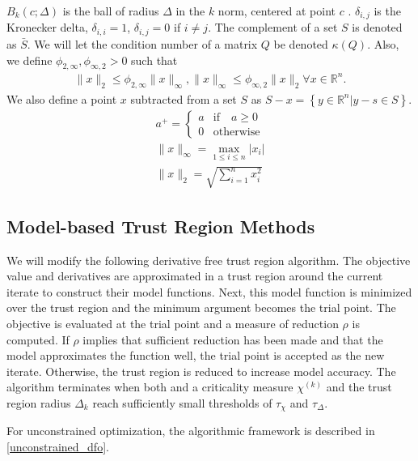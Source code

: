 \documentclass{article}
\theoremstyle{case}
\numberwithin{theorem}{subsection}
\newcommand{\chik}{{\chi^{(k)}}}
\newcommand{\Rn}{\mathbb R^n}
\begin{document}
$B_k(c; \Delta)$ is the ball of radius $\Delta$ in the $k$ norm, centered at point $c$ .
$\delta_{i,j}$ is the Kronecker delta, $\delta_{i,i} = 1$, $\delta_{i,j} = 0$ if $i\ne j$.
The complement of a set $S$ is denoted as $\bar S$.
We will let the condition number of a matrix $Q$ be denoted $\kappa(Q)$.
Also, we define $\phi_{2,\infty},\phi_{\infty,2}>0$ such that 
\begin{align}
\|x\|_2 \le \phi_{2, \infty}\|x\|_{\infty}, \|x\|_{\infty} \le \phi_{\infty,2}\|x\|_2\forall x \in \Rn \label{define_norm_changers}.
\end{align}
We also define a point $x$ subtracted from a set $S$ as $S - x = \left\{y \in \Rn | y - s \in S\right\}$.
\begin{align*}
a^+ = \begin{cases} a & \textrm{if} \quad a \ge 0 \\ 0 & \textrm{otherwise} \end{cases}\\
\|x\|_{\infty} = \max_{1\le i\le n}|x_i| \\
\|x\|_{2} = \sqrt{\sum_{i=1}^n x_i^2}
\end{align*}

\subsection{Model-based Trust Region Methods}

We will modify the following derivative free trust region algorithm.
The objective value and derivatives are approximated in a trust region around the current iterate to construct their model functions.
Next, this model function is minimized over the trust region and the minimum argument becomes the trial point.
The objective is evaluated at the trial point and a measure of reduction $\rho$ is computed.
If $\rho$ implies that sufficient reduction has been made and that the model approximates the function well, the trial point is accepted as the new iterate.
Otherwise, the trust region is reduced to increase model accuracy.
The algorithm terminates when both and a criticality measure $\chik$ and the trust region radius $\Delta_k$ reach sufficiently small thresholds of $\tau_{\chi}$ and $\tau_{\Delta}$.


For unconstrained optimization, the algorithmic framework is described in \cref{unconstrained_dfo}.
\end{document}
